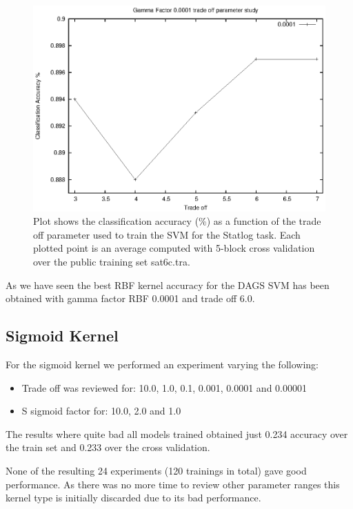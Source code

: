 \documentclass[a4paper,10pt,titlepage]{article}
\begin{document}
\begin{figure}[H]
	\centerline{%
	\includegraphics[]{adv_2_rbf.eps}
	}
	\caption[Statlog Task: Gamma factor 0.0001 trade off experiment for RBF kernel]{Plot shows the classification accuracy (\%)  as a function of the trade off parameter used to train the SVM for the Statlog task. Each plotted point is an average computed with 5-block cross validation over the public training set sat6c.tra.}
\end{figure}

\par As we have seen the best RBF kernel accuracy for the DAGS SVM has been obtained with gamma factor RBF 0.0001 and trade off 6.0.


\subsection{Sigmoid Kernel}

\par For the sigmoid kernel we performed an experiment varying the following:
\begin{itemize}
	\item Trade off was reviewed for: 10.0, 1.0, 0.1, 0.001, 0.0001 and 0.00001
	 \item S sigmoid factor for: 10.0, 2.0 and 1.0
\end{itemize}

\par The results where quite bad all models trained obtained just 0.234 accuracy over the train set and 0.233 over the cross validation. 

\par None of the resulting 24 experiments (120 trainings in total) gave good performance. As there was no more time to review
other parameter ranges this kernel type is initially discarded due to its bad performance. 
\end{document}
